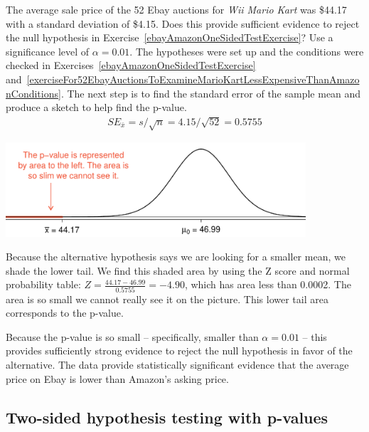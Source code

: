 \begin{example}{The average sale price of the 52 Ebay auctions for \emph{Wii Mario Kart} was \$44.17 with a standard deviation of \$4.15. Does this provide sufficient evidence to reject the null hypothesis in Exercise~\ref{ebayAmazonOneSidedTestExercise}? Use a significance level of $\alpha = 0.01$.}
The hypotheses were set up and the conditions were checked in Exercises~\ref{ebayAmazonOneSidedTestExercise} and~\ref{exerciseFor52EbayAuctionsToExamineMarioKartLessExpensiveThanAmazonConditions}. The next step is to find the standard error of the sample mean and produce a sketch to help find the p-value.
\begin{eqnarray*}
SE_{\bar{x}} = s/\sqrt{n} = 4.15/\sqrt{52} = 0.5755
\end{eqnarray*}
\begin{center}
\includegraphics[height=35mm]{04/figures/pVForEbayAmazonComparison/pVForEbayAmazonComparison}
\end{center}
Because the alternative hypothesis says we are looking for a smaller mean, we shade the lower tail. We find this shaded area by using the Z score and normal probability table: $Z = \frac{44.17 - 46.99}{0.5755} = -4.90$, which has area less than 0.0002. The area is so small we cannot really see it on the picture. This lower tail area corresponds to the p-value.

Because the p-value is so small -- specifically, smaller than $\alpha = 0.01$ -- this provides sufficiently strong evidence to reject the null hypothesis in favor of the alternative. The data provide statistically significant evidence that the average price on Ebay is lower than Amazon's asking price.
\end{example}



\pagebreak

\subsection{Two-sided hypothesis testing with p-values}
\label{twoSidedTestsWithPValues}

